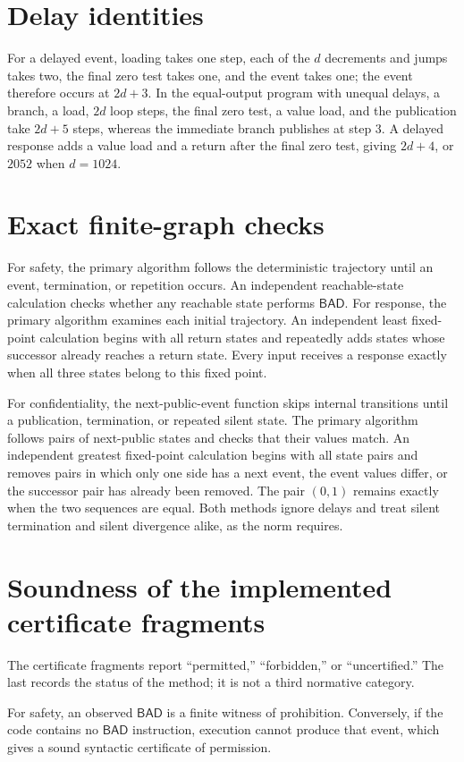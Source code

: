 \documentclass[11pt]{article}
\newcommand{\bad}{\mathsf{BAD}}
\begin{document}
\section{Delay identities}
For a delayed event, loading takes one step, each of the $d$ decrements and jumps takes two, the final zero test takes one, and the event takes one; the event therefore occurs at $2d+3$. In the equal-output program with unequal delays, a branch, a load, $2d$ loop steps, the final zero test, a value load, and the publication take $2d+5$ steps, whereas the immediate branch publishes at step $3$. A delayed response adds a value load and a return after the final zero test, giving $2d+4$, or $2052$ when $d=1024$.

\section{Exact finite-graph checks}
For safety, the primary algorithm follows the deterministic trajectory until an event, termination, or repetition occurs. An independent reachable-state calculation checks whether any reachable state performs $\bad$. For response, the primary algorithm examines each initial trajectory. An independent least fixed-point calculation begins with all return states and repeatedly adds states whose successor already reaches a return state. Every input receives a response exactly when all three states belong to this fixed point.

For confidentiality, the next-public-event function skips internal transitions until a publication, termination, or repeated silent state. The primary algorithm follows pairs of next-public states and checks that their values match. An independent greatest fixed-point calculation begins with all state pairs and removes pairs in which only one side has a next event, the event values differ, or the successor pair has already been removed. The pair $(0,1)$ remains exactly when the two sequences are equal. Both methods ignore delays and treat silent termination and silent divergence alike, as the norm requires.

\section{Soundness of the implemented certificate fragments}
The certificate fragments report ``permitted,'' ``forbidden,'' or ``uncertified.'' The last records the status of the method; it is not a third normative category.

For safety, an observed $\bad$ is a finite witness of prohibition. Conversely, if the code contains no $\bad$ instruction, execution cannot produce that event, which gives a sound syntactic certificate of permission.
\end{document}

